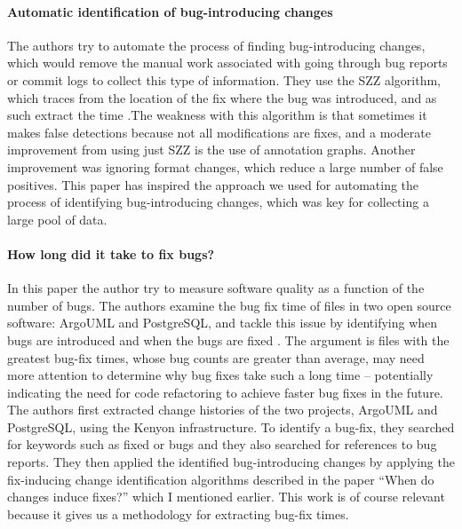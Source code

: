 \paragraph{Automatic identification of bug-introducing changes}
The authors try to automate the process of finding bug-introducing
changes, which would remove the manual work associated with going
through bug reports or commit logs to collect this type of
information. They use the SZZ algorithm, which traces from the
location of the fix where the bug was introduced, and as such extract
the time \cite{2006-automatic}.The weakness with this algorithm is
that sometimes it makes false detections because not all modifications
are fixes, and a moderate improvement from using just SZZ is the use
of annotation graphs. Another improvement was ignoring format changes,
which reduce a large number of false positives. This paper has
inspired the approach we used for automating the process of
identifying bug-introducing changes, which was key for collecting a
large pool of data.

\paragraph{How long did it take to fix bugs?}
In this paper the author try to measure software quality as a function
of the number of bugs. The authors examine the bug fix time of files
in two open source software: ArgoUML and PostgreSQL, and tackle this
issue by identifying when bugs are introduced and when the bugs are
fixed \cite{2006-long}. The argument is files with the greatest
bug-fix times, whose bug counts are greater than average, may need
more attention to determine why bug fixes take such a long time –
potentially indicating the need for code refactoring to achieve faster
bug fixes in the future. The authors first extracted change histories
of the two projects, ArgoUML and PostgreSQL, using the Kenyon
infrastructure. To identify a bug-fix, they searched for keywords such
as fixed or bugs and they also searched for references to bug
reports. They then applied the identified bug-introducing changes by
applying the fix-inducing change identification algorithms described
in the paper “When do changes induce fixes?” which I mentioned
earlier.  This work is of course relevant because it gives us a
methodology for extracting bug-fix times.

